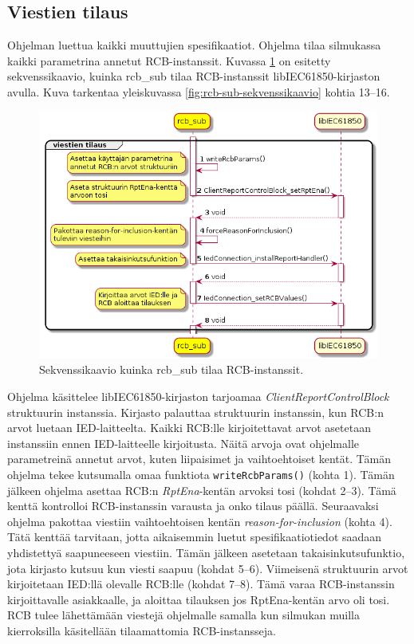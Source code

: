 \subsection{Viestien tilaus}
Ohjelman luettua kaikki muuttujien spesifikaatiot. Ohjelma tilaa silmukassa kaikki parametrina annetut RCB-instanssit. Kuvassa \ref{fig:rcb-sub-subscribe-reports} on esitetty sekvenssikaavio, kuinka rcb\_sub tilaa RCB-instanssit libIEC61850-kirjaston avulla. Kuva tarkentaa yleiskuvassa \ref{fig:rcb-sub-sekvenssikaavio} kohtia 13--16.

\begin{figure}[ht!]
	\includegraphics[width=1\textwidth]{pictures/rcb-sub-subscribe-reports.png}
	\caption{Sekvenssikaavio kuinka rcb\_sub tilaa RCB-instanssit.}
	\label{fig:rcb-sub-subscribe-reports}
\end{figure}

Ohjelma käsittelee libIEC61850-kirjaston tarjoamaa \emph{ClientReportControlBlock} struktuurin instanssia. Kirjasto palauttaa struktuurin instanssin, kun RCB:n arvot luetaan IED-laitteelta. Kaikki RCB:lle kirjoitettavat arvot asetetaan instanssiin ennen IED-laitteelle kirjoitusta. Näitä arvoja ovat ohjelmalle parametreinä annetut arvot, kuten liipaisimet ja vaihtoehtoiset kentät. Tämän ohjelma tekee kutsumalla omaa funktiota \texttt{wri\-teRcb\-Pa\-rams\-()} (kohta 1). Tämän jälkeen ohjelma asettaa RCB:n \emph{RptEna}-kentän arvoksi tosi (kohdat 2--3). Tämä kenttä kontrolloi RCB-instanssin varausta ja onko tilaus päällä. Seuraavaksi ohjelma pakottaa viestiin vaihtoehtoisen kentän \emph{reason-for-inclusion} (kohta 4). Tätä kenttää tarvitaan, jotta aikaisemmin luetut spesifikaatiotiedot saadaan yhdistettyä saapuneeseen viestiin. Tämän jälkeen asetetaan takaisinkutsufunktio, jota kirjasto kutsuu kun viesti saapuu (kohdat 5--6). Viimeisenä struktuurin arvot kirjoitetaan IED:llä olevalle RCB:lle (kohdat 7--8). Tämä varaa RCB-instanssin kirjoittavalle asiakkaalle, ja aloittaa tilauksen jos RptEna-kentän arvo oli tosi. RCB tulee lähettämään viestejä ohjelmalle samalla kun silmukan muilla kierroksilla käsitellään tilaamattomia RCB-instansseja.


